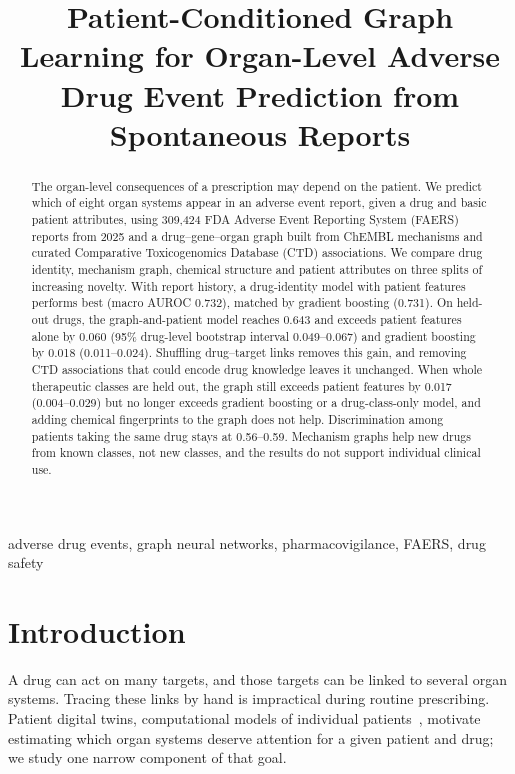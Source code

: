 \documentclass[conference,letterpaper]{IEEEtran}
\begin{document}
\title{Patient-Conditioned Graph Learning for Organ-Level Adverse Drug Event Prediction from Spontaneous Reports}
\author{
}
\maketitle

\begin{abstract}
The organ-level consequences of a prescription may depend on the patient. We predict which of eight organ systems appear in an adverse event report, given a drug and basic patient attributes, using 309,424 FDA Adverse Event Reporting System (FAERS) reports from 2025 and a drug--gene--organ graph built from ChEMBL mechanisms and curated Comparative Toxicogenomics Database (CTD) associations. We compare drug identity, mechanism graph, chemical structure and patient attributes on three splits of increasing novelty. With report history, a drug-identity model with patient features performs best (macro AUROC 0.732), matched by gradient boosting (0.731). On held-out drugs, the graph-and-patient model reaches 0.643 and exceeds patient features alone by 0.060 (95\% drug-level bootstrap interval 0.049--0.067) and gradient boosting by 0.018 (0.011--0.024). Shuffling drug--target links removes this gain, and removing CTD associations that could encode drug knowledge leaves it unchanged. When whole therapeutic classes are held out, the graph still exceeds patient features by 0.017 (0.004--0.029) but no longer exceeds gradient boosting or a drug-class-only model, and adding chemical fingerprints to the graph does not help. Discrimination among patients taking the same drug stays at 0.56--0.59. Mechanism graphs help new drugs from known classes, not new classes, and the results do not support individual clinical use.
\end{abstract}

\begin{IEEEkeywords}
adverse drug events, graph neural networks, pharmacovigilance, FAERS, drug safety
\end{IEEEkeywords}

\section{Introduction}
A drug can act on many targets, and those targets can be linked to several organ systems. Tracing these links by hand is impractical during routine prescribing. Patient digital twins, computational models of individual patients~\cite{bjornsson2020,katsoulakis2024}, motivate estimating which organ systems deserve attention for a given patient and drug; we study one narrow component of that goal.
\end{document}

